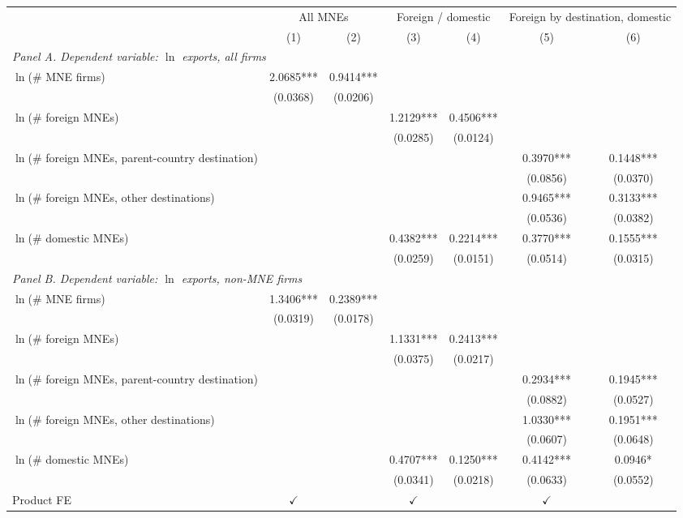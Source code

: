 \begin{tabular}{lcccccc} \hline
 & \multicolumn{2}{c}{All MNEs} & \multicolumn{2}{c}{Foreign / domestic} & \multicolumn{2}{c}{Foreign by destination, domestic} \\
 & (1) & (2) & (3) & (4) & (5) & (6) \\ \hline
\multicolumn{7}{l}{\textit{Panel A. Dependent variable: $\ln$ exports, all firms}} \\
$\ln$(\# MNE firms) & 2.0685*** & 0.9414*** &  &  &  &  \\
 & (0.0368) & (0.0206) &  &  &  &  \\
$\ln$(\# foreign MNEs) &  &  & 1.2129*** & 0.4506*** &  &  \\
 &  &  & (0.0285) & (0.0124) &  &  \\
$\ln$(\# foreign MNEs, parent-country destination) &  &  &  &  & 0.3970*** & 0.1448*** \\
 &  &  &  &  & (0.0856) & (0.0370) \\
$\ln$(\# foreign MNEs, other destinations) &  &  &  &  & 0.9465*** & 0.3133*** \\
 &  &  &  &  & (0.0536) & (0.0382) \\
$\ln$(\# domestic MNEs) &  &  & 0.4382*** & 0.2214*** & 0.3770*** & 0.1555*** \\
 &  &  & (0.0259) & (0.0151) & (0.0514) & (0.0315) \\
\midrule
\multicolumn{7}{l}{\textit{Panel B. Dependent variable: $\ln$ exports, non-MNE firms}} \\
$\ln$(\# MNE firms) & 1.3406*** & 0.2389*** &  &  &  &  \\
 & (0.0319) & (0.0178) &  &  &  &  \\
$\ln$(\# foreign MNEs) &  &  & 1.1331*** & 0.2413*** &  &  \\
 &  &  & (0.0375) & (0.0217) &  &  \\
$\ln$(\# foreign MNEs, parent-country destination) &  &  &  &  & 0.2934*** & 0.1945*** \\
 &  &  &  &  & (0.0882) & (0.0527) \\
$\ln$(\# foreign MNEs, other destinations) &  &  &  &  & 1.0330*** & 0.1951*** \\
 &  &  &  &  & (0.0607) & (0.0648) \\
$\ln$(\# domestic MNEs) &  &  & 0.4707*** & 0.1250*** & 0.4142*** & 0.0946* \\
 &  &  & (0.0341) & (0.0218) & (0.0633) & (0.0552) \\
\hline
Product FE & $\checkmark$ &  & $\checkmark$ &  & $\checkmark$ &  \\

\end{tabular}

